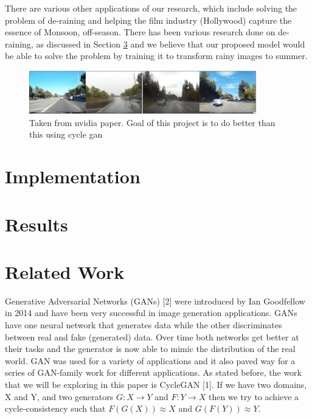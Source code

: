 \documentclass{article}
\begin{document}
There are various other applications of our research, which include 
solving the problem of de-raining and helping the film industry (Hollywood)
 capture the essence of Monsoon, off-season. There has been various research 
 done on de-raining, as discussed in Section \ref{gen_inst} and we believe that our 
 proposed model would be able to solve the problem by training it to 
 transform rainy images to summer.

 \begin{figure}[htb!]
  \centering
  \includegraphics[width=99mm]{image.png}
  \caption{Taken from nvidia paper. Goal of this project is to do better 
  than this using cycle gan \label{overflow}}
\end{figure}

\section{Implementation}

\section{Results}

\section{Related Work}
\label{gen_inst}

Generative Adversarial Networks (GANs) [2] were introduced by 
Ian Goodfellow in 2014 and have been very successful in image generation 
applications. GANs have one neural network that generates data while the 
other discriminates between real and fake (generated) data. Over time 
both networks get better at their tasks and the generator is now able to 
mimic the distribution of the real world. GAN was used for a variety of 
applications and it also paved way for a series of GAN-family work for 
different applications. As stated before, the work that we will be 
exploring in this paper is CycleGAN [1]. If we have two domains, X and Y, 
and two generators $G: X \rightarrow Y$ and $F: Y \rightarrow  X$ then we try to achieve a 
cycle-consistency such that $F(G(X)) \approx X$ and $G(F(Y)) \approx Y$.
\end{document}
